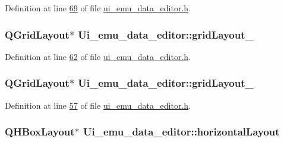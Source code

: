 Definition at line \hyperlink{a00138_source_l00069}{69} of file \hyperlink{a00138_source}{ui\+\_\+emu\+\_\+data\+\_\+editor.\+h}.

\hypertarget{a00079_a8e397832e536976b6717e1d509226b8d}{
\subsubsection[{grid\+Layout\+\_\+4}]{\setlength{\rightskip}{0pt plus 5cm}Q\+Grid\+Layout$\ast$ Ui\+\_\+emu\+\_\+data\+\_\+editor\+::grid\+Layout\+\_}}\label{a00079_a8e397832e536976b6717e1d509226b8d}


Definition at line \hyperlink{a00138_source_l00062}{62} of file \hyperlink{a00138_source}{ui\+\_\+emu\+\_\+data\+\_\+editor.\+h}.

\hypertarget{a00079_ac56612bd2595405ccbdfe4aae45eccd7}{
\subsubsection[{grid\+Layout\+\_\+5}]{\setlength{\rightskip}{0pt plus 5cm}Q\+Grid\+Layout$\ast$ Ui\+\_\+emu\+\_\+data\+\_\+editor\+::grid\+Layout\+\_}}\label{a00079_ac56612bd2595405ccbdfe4aae45eccd7}


Definition at line \hyperlink{a00138_source_l00057}{57} of file \hyperlink{a00138_source}{ui\+\_\+emu\+\_\+data\+\_\+editor.\+h}.

\hypertarget{a00079_ad3009fa6ef8958b3e052715beba75d28}{
\subsubsection[{horizontal\+Layout}]{\setlength{\rightskip}{0pt plus 5cm}Q\+H\+Box\+Layout$\ast$ Ui\+\_\+emu\+\_\+data\+\_\+editor\+::horizontal\+Layout}}\label{a00079_ad3009fa6ef8958b3e052715beba75d28}


